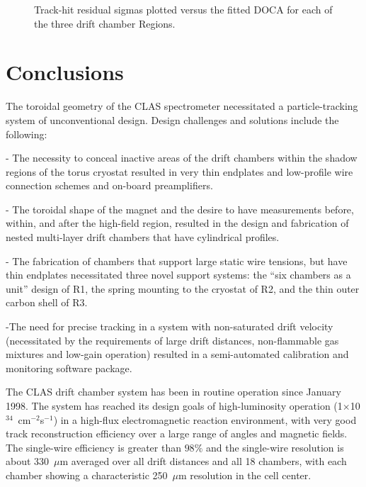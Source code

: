 \begin{figure}[htpb]
\vspace{9cm} 
\caption{\small{Track-hit residual sigmas plotted versus the fitted DOCA for each
of the three drift chamber Regions. }}
\label{sigres}
\end{figure}

\section{Conclusions}

\hskip 0.15in
The toroidal geometry of the CLAS spectrometer necessitated a particle-tracking 
system of unconventional design.  Design challenges and solutions include the following:

\vskip 10pt
\noindent
- The necessity to conceal inactive areas of the drift chambers within the
shadow regions of the torus cryostat resulted in very thin endplates and low-profile
wire connection schemes and on-board preamplifiers.

\noindent
- The toroidal shape of the magnet and the desire to have measurements before, within, 
and after the high-field region, resulted in the design and fabrication of nested 
multi-layer drift chambers that have cylindrical profiles.

\noindent
- The fabrication of chambers that support large static wire tensions, but have thin 
endplates necessitated three novel support systems: the ``six chambers as a unit'' 
design of R1, the spring mounting to the cryostat of R2, and the thin outer carbon 
shell of R3.

\noindent
-The need for precise tracking in a system with non-saturated drift velocity 
(necessitated by the requirements of large drift distances, non-flammable gas mixtures 
and low-gain operation) resulted in a semi-automated calibration and monitoring software 
package.

\vskip 10pt
The CLAS drift chamber system has been in routine operation since January 1998. 
The system has reached its design goals of 
high-luminosity operation (1$\times$10$^{34}$~cm$^{-2}$s$^{-1}$) in a 
high-flux electromagnetic reaction environment, with very good track 
reconstruction efficiency over a large range of angles and 
magnetic fields.  The single-wire efficiency is greater than $98\%$ and the
single-wire resolution is about 330~$\mu$m averaged over all drift distances and
all 18 chambers, with each chamber showing a characteristic 250~$\mu$m resolution 
in the cell center.

